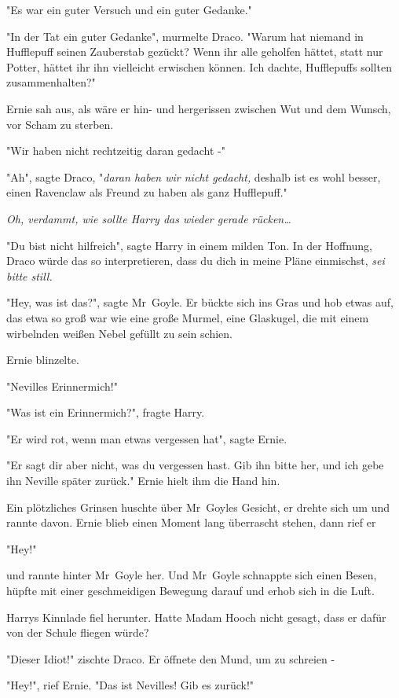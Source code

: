 {"Es war ein guter Versuch und ein guter Gedanke."

"In der Tat ein guter Gedanke", murmelte Draco. "Warum hat niemand in Hufflepuff seinen Zauberstab gezückt? Wenn ihr alle geholfen hättet, statt nur Potter, hättet ihr ihn vielleicht erwischen können. Ich dachte, Hufflepuffs sollten zusammenhalten?"

Ernie sah aus, als wäre er hin- und hergerissen zwischen Wut und dem Wunsch, vor Scham zu sterben.

"Wir haben nicht rechtzeitig daran gedacht -"

"Ah", sagte Draco, "\emph{daran haben wir nicht gedacht,} deshalb ist es wohl besser, einen Ravenclaw als Freund zu haben als ganz Hufflepuff."

\emph{Oh, verdammt, wie sollte Harry das wieder gerade rücken…}

"Du bist nicht hilfreich", sagte Harry in einem milden Ton. In der Hoffnung, Draco würde das so interpretieren, dass du dich in meine Pläne einmischst, \emph{sei bitte still.}

"Hey, was ist das?", sagte Mr~Goyle. Er bückte sich ins Gras und hob etwas auf, das etwa so groß war wie eine große Murmel, eine Glaskugel, die mit einem wirbelnden weißen Nebel gefüllt zu sein schien.

Ernie blinzelte.

"Nevilles Erinnermich!"

"Was ist ein Erinnermich?", fragte Harry.

"Er wird rot, wenn man etwas vergessen hat", sagte Ernie.

"Er sagt dir aber nicht, was du vergessen hast. Gib ihn bitte her, und ich gebe ihn Neville später zurück." Ernie hielt ihm die Hand hin.

Ein plötzliches Grinsen huschte über Mr~Goyles Gesicht, er drehte sich um und rannte davon. Ernie blieb einen Moment lang überrascht stehen, dann rief er

"Hey!"

und rannte hinter Mr~Goyle her. Und Mr~Goyle schnappte sich einen Besen, hüpfte mit einer geschmeidigen Bewegung darauf und erhob sich in die Luft.

Harrys Kinnlade fiel herunter. Hatte Madam Hooch nicht gesagt, dass er dafür von der Schule fliegen würde?

"Dieser Idiot!" zischte Draco. Er öffnete den Mund, um zu schreien -

"Hey!", rief Ernie. "Das ist Nevilles! Gib es zurück!"

}
